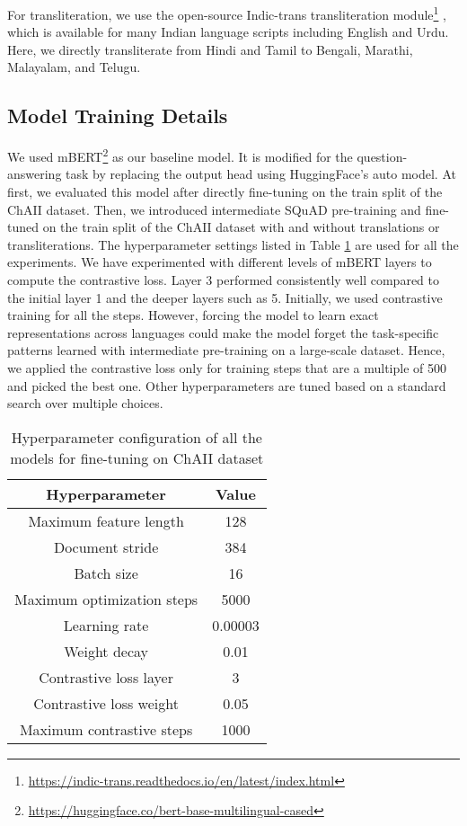 \documentclass[11pt]{article}
\begin{document}
For transliteration, we use the open-source Indic-trans transliteration module\footnote{\url{https://indic-trans.readthedocs.io/en/latest/index.html}} \cite{Bhat:2014:ISS:2824864.2824872}, which is available for many Indian language scripts including English and Urdu. Here, we directly transliterate from Hindi and Tamil to Bengali, Marathi, Malayalam, and Telugu.

\subsection{Model Training Details}
We used mBERT\footnote{\url{https://huggingface.co/bert-base-multilingual-cased}} as our baseline model. It is modified for the question-answering task by replacing the output head using HuggingFace's auto model. At first, we evaluated this model after directly fine-tuning on the train split of the ChAII dataset. Then, we introduced intermediate SQuAD pre-training and fine-tuned on the train split of the ChAII dataset with and without translations or transliterations.  The hyperparameter settings listed in Table \ref{tab:hyperparam} are used for all the experiments. We have experimented with different levels of mBERT layers to compute the contrastive loss. Layer 3 performed consistently well compared to the initial layer 1 and the deeper layers such as 5. Initially, we used contrastive training for all the steps. However, forcing the model to learn exact representations across languages could make the model forget the task-specific patterns learned with intermediate pre-training on a large-scale dataset. Hence, we applied the contrastive loss only for training steps that are a multiple of 500 and picked the best one. Other hyperparameters are tuned based on a standard search over multiple choices.

\begin{table}[h]
\begin{center}
\begin{tabular}{c c}
\hline
\textbf{Hyperparameter}         & \textbf{Value}\\ \hline
Maximum feature length & 128                                                 \\
Document stride        &  384                                                   \\
Batch size             & 16                                                   \\
Maximum optimization steps         & 5000                                                  \\
Learning rate          & 0.00003                                           \\
Weight decay           & 0.01              \\
Contrastive loss layer & 3 \\
Contrastive loss weight & 0.05 \\
Maximum contrastive steps & 1000 \\
\hline
\end{tabular}
\caption{Hyperparameter configuration of all the models for fine-tuning on ChAII dataset}
\label{tab:hyperparam}
\end{center}
\end{table}
\end{document}

